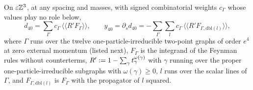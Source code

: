 \begin{lemma}\label{lem:a05:forest}
On $\varepsilon\mathbb Z^3$, at any spacing and masses, with signed combinatorial weights $c_\Gamma$ whose values play no role below,
\[
d_{40}=\sum_\Gamma c_\Gamma\,\langle\langle R'F_\Gamma\rangle\rangle,\qquad y_{40}=\partial_sd_{40}=-\sum_\Gamma\sum_{l}c_\Gamma\,\langle\langle R'F_{\Gamma,\mathrm{dbl}(l)}\rangle\rangle ,
\]
where $\Gamma$ runs over the twelve one-particle-irreducible two-point graphs of order $e^4$ at zero external momentum (listed next), $F_\Gamma$ is the integrand of the Feynman rules without counterterms, $R':=1-\sum_\gamma t^{\omega(\gamma)}_\gamma$ with $\gamma$ running over the proper one-particle-irreducible subgraphs with $\omega(\gamma)\ge0$, $l$ runs over the scalar lines of $\Gamma$, and $F_{\Gamma,\mathrm{dbl}(l)}$ is $F_\Gamma$ with the propagator of $l$ squared.
\end{lemma}
